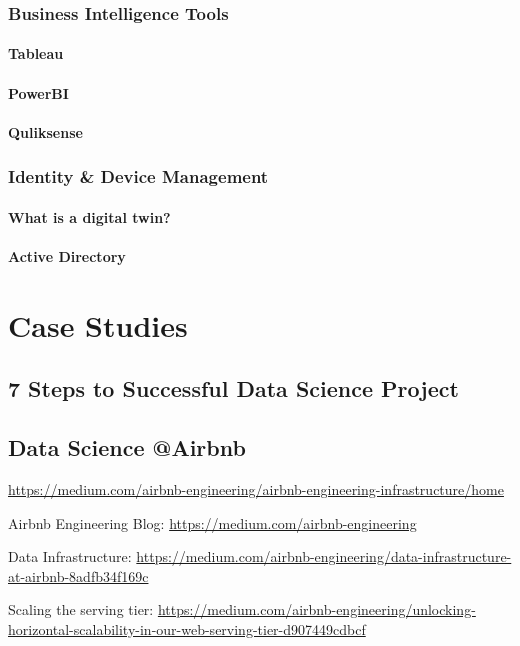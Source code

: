 \documentclass[12pt]{scrartcl} %
\begin{document}
\subsubsection{Business Intelligence Tools}
\paragraph{Tableau}
\paragraph{PowerBI}
\paragraph{Quliksense}
 
\subsubsection{Identity \& Device Management}

\paragraph{What is a digital twin?}
\paragraph{Active Directory}


\section{Case Studies}
\subsection{7 Steps to Successful Data Science Project}
\subsection{Data Science @Airbnb}
\url{https://medium.com/airbnb-engineering/airbnb-engineering-infrastructure/home}

Airbnb Engineering Blog: 
\url{https://medium.com/airbnb-engineering}

Data Infrastructure: 
\url{https://medium.com/airbnb-engineering/data-infrastructure-at-airbnb-8adfb34f169c}

Scaling the serving tier:
\url{https://medium.com/airbnb-engineering/unlocking-horizontal-scalability-in-our-web-serving-tier-d907449cdbcf}
\end{document}
